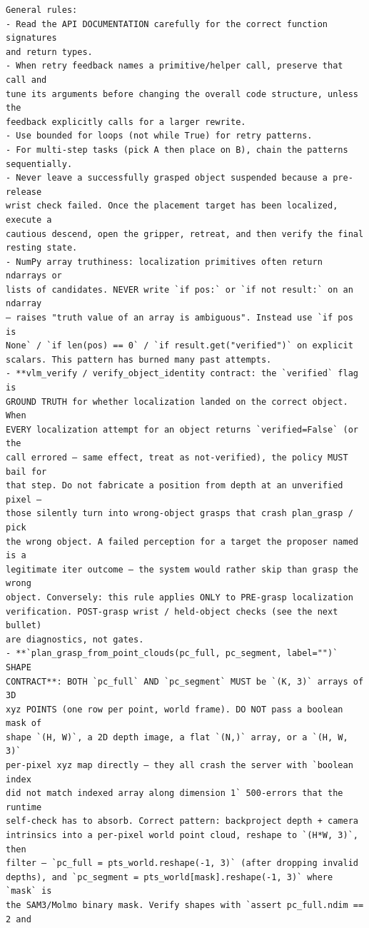 \documentclass{llmxive}
\begin{document}
\begin{lstlisting}[style=ratsappendixprompt]
General rules:
- Read the API DOCUMENTATION carefully for the correct function signatures
and return types.
- When retry feedback names a primitive/helper call, preserve that call and
tune its arguments before changing the overall code structure, unless the
feedback explicitly calls for a larger rewrite.
- Use bounded for loops (not while True) for retry patterns.
- For multi-step tasks (pick A then place on B), chain the patterns
sequentially.
- Never leave a successfully grasped object suspended because a pre-release
wrist check failed. Once the placement target has been localized, execute a
cautious descend, open the gripper, retreat, and then verify the final
resting state.
- NumPy array truthiness: localization primitives often return ndarrays or
lists of candidates. NEVER write `if pos:` or `if not result:` on an ndarray
— raises "truth value of an array is ambiguous". Instead use `if pos is
None` / `if len(pos) == 0` / `if result.get("verified")` on explicit
scalars. This pattern has burned many past attempts.
- **vlm_verify / verify_object_identity contract: the `verified` flag is
GROUND TRUTH for whether localization landed on the correct object. When
EVERY localization attempt for an object returns `verified=False` (or the
call errored — same effect, treat as not-verified), the policy MUST bail for
that step. Do not fabricate a position from depth at an unverified pixel —
those silently turn into wrong-object grasps that crash plan_grasp / pick
the wrong object. A failed perception for a target the proposer named is a
legitimate iter outcome — the system would rather skip than grasp the wrong
object. Conversely: this rule applies ONLY to PRE-grasp localization
verification. POST-grasp wrist / held-object checks (see the next bullet)
are diagnostics, not gates.
- **`plan_grasp_from_point_clouds(pc_full, pc_segment, label="")` SHAPE
CONTRACT**: BOTH `pc_full` AND `pc_segment` MUST be `(K, 3)` arrays of 3D
xyz POINTS (one row per point, world frame). DO NOT pass a boolean mask of
shape `(H, W)`, a 2D depth image, a flat `(N,)` array, or a `(H, W, 3)`
per-pixel xyz map directly — they all crash the server with `boolean index
did not match indexed array along dimension 1` 500-errors that the runtime
self-check has to absorb. Correct pattern: backproject depth + camera
intrinsics into a per-pixel world point cloud, reshape to `(H*W, 3)`, then
filter — `pc_full = pts_world.reshape(-1, 3)` (after dropping invalid
depths), and `pc_segment = pts_world[mask].reshape(-1, 3)` where `mask` is
the SAM3/Molmo binary mask. Verify shapes with `assert pc_full.ndim == 2 and

\end{lstlisting}
\end{document}
